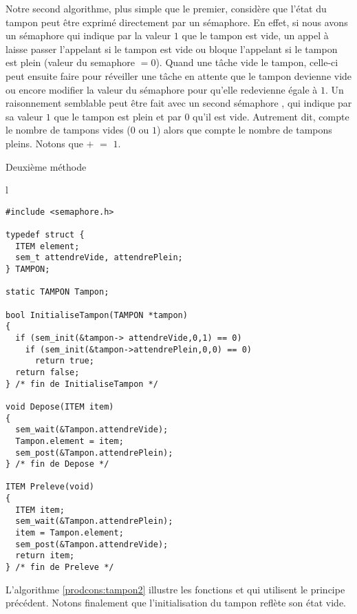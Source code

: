 Notre second algorithme, plus simple que le premier, considère que l'état du tampon peut être exprimé directement par un sémaphore. En effet, si nous avons un sémaphore  qui indique par la valeur $1$ que le tampon est vide, un appel à  laisse passer l'appelant si le tampon est vide ou bloque l'appelant si le tampon est plein (valeur du semaphore $= 0$). Quand une tâche vide le tampon, celle-ci peut ensuite faire  pour réveiller une tâche en attente que le tampon devienne vide ou encore modifier la valeur du sémaphore pour qu'elle redevienne égale à $1$. Un raisonnement semblable peut être fait avec un second sémaphore , qui indique par sa valeur $1$ que le tampon est plein et par $0$ qu'il est vide. Autrement dit,  compte le nombre de tampons vides ($0$ ou $1$) alors que  compte le nombre de tampons pleins. Notons que  $+$  $=$ $1$.

\begin{algorithm}[h!t]
\caption{Deuxième méthode}\label{prodcons:tampon2}
\begin{center}
\begin{tabular}{l}
\lstset{language=C++}
\begin{lstlisting}
#include <semaphore.h>

typedef struct {
  ITEM element;
  sem_t attendreVide, attendrePlein;
} TAMPON;

static TAMPON Tampon;

bool InitialiseTampon(TAMPON *tampon)
{
  if (sem_init(&tampon-> attendreVide,0,1) == 0)
    if (sem_init(&tampon->attendrePlein,0,0) == 0)
      return true;
  return false;
} /* fin de InitialiseTampon */

void Depose(ITEM item)
{
  sem_wait(&Tampon.attendreVide);
  Tampon.element = item;
  sem_post(&Tampon.attendrePlein);
} /* fin de Depose */

ITEM Preleve(void)
{
  ITEM item;
  sem_wait(&Tampon.attendrePlein);
  item = Tampon.element;
  sem_post(&Tampon.attendreVide);
  return item;
} /* fin de Preleve */
\end{lstlisting}
\end{tabular}
\end{center}
\end{algorithm}

L'algorithme \ref{prodcons:tampon2} illustre les fonctions  et  qui utilisent le principe précédent. Notons finalement que l'initialisation du tampon reflète son état vide.


